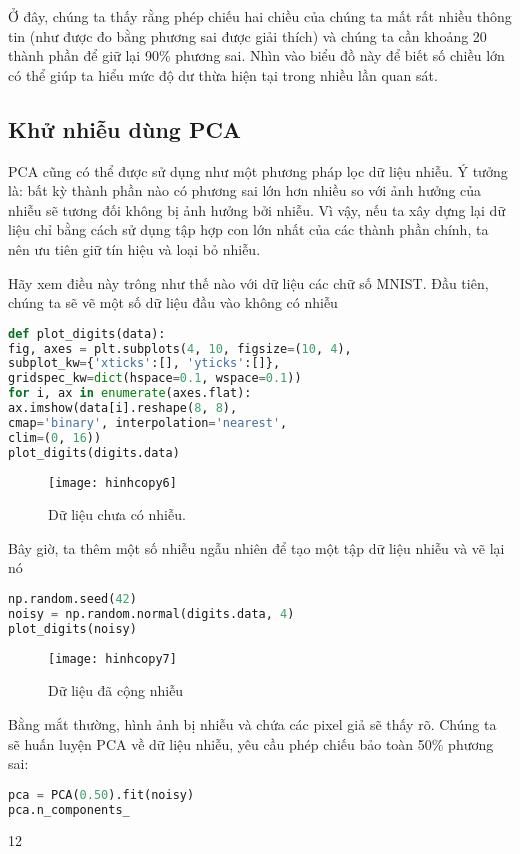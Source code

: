 Ở đây, chúng ta thấy rằng phép chiếu hai chiều của chúng ta mất rất nhiều thông tin (như được đo bằng phương sai được giải thích) và chúng ta cần khoảng 20 thành phần để giữ lại 90\% phương sai. Nhìn vào biểu đồ này để biết số chiều lớn có thể giúp ta hiểu mức độ dư thừa hiện tại trong nhiều lần quan sát.
\subsection{Khử nhiễu dùng PCA}
PCA cũng có thể được sử dụng như một phương pháp lọc dữ liệu nhiễu. Ý tưởng là: bất kỳ thành phần nào có phương sai lớn hơn nhiều so với ảnh hưởng của nhiễu sẽ tương đối không bị ảnh hưởng bởi nhiễu. Vì vậy, nếu ta xây dựng lại dữ liệu chỉ bằng cách sử dụng tập hợp con lớn nhất của các thành phần chính, ta nên ưu tiên giữ tín hiệu và loại bỏ nhiễu.

Hãy xem điều này trông như thế nào với dữ liệu các chữ số MNIST. Đầu tiên, chúng ta sẽ vẽ một số dữ liệu đầu vào không có nhiễu
\begin{lstlisting}[language=Python]
def plot_digits(data):
fig, axes = plt.subplots(4, 10, figsize=(10, 4),
subplot_kw={'xticks':[], 'yticks':[]},
gridspec_kw=dict(hspace=0.1, wspace=0.1))
for i, ax in enumerate(axes.flat):
ax.imshow(data[i].reshape(8, 8),
cmap='binary', interpolation='nearest',
clim=(0, 16))
plot_digits(digits.data)
\end{lstlisting}

\begin{figure}[htb]
	\centering
	\texttt{[image: hinhcopy6]}
	\caption{Dữ liệu chưa có nhiễu.}
	\label{fig:hinhcopy6}
\end{figure}
Bây giờ, ta thêm một số nhiễu ngẫu nhiên để tạo một tập dữ liệu nhiễu và vẽ lại nó
\begin{lstlisting}[language=Python]
np.random.seed(42)
noisy = np.random.normal(digits.data, 4)
plot_digits(noisy)
\end{lstlisting}
\begin{figure}[htb]
	\centering
	\texttt{[image: hinhcopy7]}
	\caption{Dữ liệu đã cộng nhiễu}
	\label{fig:hinhcopy7}
\end{figure}
Bằng mắt thường, hình ảnh bị nhiễu và chứa các pixel giả sẽ thấy rõ. Chúng ta sẽ huấn luyện PCA về dữ liệu nhiễu, yêu cầu phép chiếu bảo toàn 50\% phương sai:
\begin{lstlisting}[language=Python]
pca = PCA(0.50).fit(noisy)
pca.n_components_
\end{lstlisting}
12

